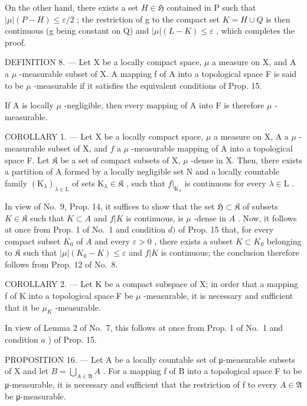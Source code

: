 On the other hand, there exists a set \(H \in \mathfrak{H}\) contained in P such that \(|\mu|(P - H) \leqslant \varepsilon/2\) ; the restriction of g to the compact set \(K = H \cup Q\) is then continuous (g being constant on Q) and \(|\mu|(L - K) \leqslant \varepsilon\) , which completes the proof.

DEFINITION 8. --- Let X be a locally compact space, \(\mu\) a measure on X, and A a \(\mu\) -measurable subset of X. A mapping f of A into a topological space F is said to be \(\mu\) -measurable if it satisfies the equivalent conditions of Prop. 15.

If A is locally \(\mu\) -negligible, then every mapping of A into F is therefore \(\mu\) -measurable.

COROLLARY 1. --- Let X be a locally compact space, \(\mu\) a measure on X, A a \(\mu\) -measurable subset of X, and \(f\) a \(\mu\) -measurable mapping of A into a topological space F. Let \(\mathfrak{K}\) be a set of compact subsets of X, \(\mu\) -dense in X. Then, there exists a partition of A formed by a locally negligible set N and a locally countable family \((\mathrm{K}_{\lambda})_{\lambda \in \mathrm{L}}\) of sets \(\mathrm{K}_{\lambda} \in \mathfrak{K}\) , such that \(f|_{\mathrm{K}_{\lambda}}\) is continuous for every \(\lambda \in \mathrm{L}\) .

In view of No.~9, Prop. 14, it suffices to show that the set \(\mathfrak{H} \subset \mathfrak{K}\) of subsets \(K \in \mathfrak{K}\) such that \(K \subset A\) and \(f|K\) is continuous, is \(\mu\) -dense in \(A\) . Now, it follows at once from Prop. 1 of No.~1 and condition \(d)\) of Prop. 15 that, for every compact subset \(K_0\) of \(A\) and every \(\varepsilon > 0\) , there exists a subset \(K \subset K_0\) belonging to \(\mathfrak{K}\) such that \(|\mu|(K_0 - K) \leqslant \varepsilon\) and \(f|K\) is continuous; the conclusion therefore follows from Prop. 12 of No.~8.

COROLLARY 2. --- Let K be a compact subspace of X; in order that a mapping f of K into a topological space F be \(\mu\) -measurable, it is necessary and sufficient that it be \(\mu_{K}\) -measurable.

In view of Lemma 2 of No.~7, this follows at once from Prop. 1 of No.~1 and condition \(a\) ) of Prop. 15.

PROPOSITION 16. --- Let A be a locally countable set of μ-measurable subsets of X and let \(B = \bigcup_{A \in \mathfrak{A}} A\) . For a mapping f of B into a topological space F to be μ-measurable, it is necessary and sufficient that the restriction of f to every \(A \in \mathfrak{A}\) be μ-measurable.

